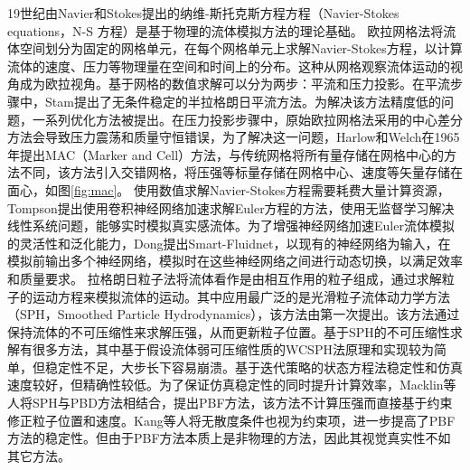\indent 19世纪由Navier和Stokes提出的纳维-斯托克斯方程方程（Navier-Stokes equations，N-S 方程）是基于物理的流体模拟方法的理论基础\cite{constantin1988navier}。
欧拉网格法\cite{chen2020extended}将流体空间划分为固定的网格单元，在每个网格单元上求解Navier-Stokes方程，以计算流体的速度、压力等物理量在空间和时间上的分布。这种从网格观察流体运动的视角成为欧拉视角。基于网格的数值求解可以分为两步：平流和压力投影\cite{chorin1968numerical}。在平流步骤中，Stam\cite{stam2023stable}提出了无条件稳定的半拉格朗日平流方法。为解决该方法精度低的问题，一系列优化方法被提出\cite{selle2008unconditionally, qu2019efficient, molemaker2008low}。在压力投影步骤中，原始欧拉网格法采用的中心差分方法会导致压力震荡和质量守恒错误，为了解决这一问题，Harlow和Welch\cite{harlow1962particle}在1965年提出MAC（Marker and Cell）方法，与传统网格将所有量存储在网格中心的方法不同，该方法引入交错网格，将压强等标量存储在网格中心、速度等矢量存储在面心，如图\ref{fig:mac}。
\newline
\indent 使用数值求解Navier-Stokes方程需要耗费大量计算资源，Tompson\cite{tompson2017accelerating}提出使用卷积神经网络加速求解Euler方程的方法，使用无监督学习解决线性系统问题，能够实时模拟真实感流体。为了增强神经网络加速Euler流体模拟的灵活性和泛化能力，Dong\cite{dong2019adaptive}提出Smart-Fluidnet，以现有的神经网络为输入，在模拟前输出多个神经网络，模拟时在这些神经网络之间进行动态切换，以满足效率和质量要求。
\newline
\indent 拉格朗日粒子法将流体看作是由相互作用的粒子组成，通过求解粒子的运动方程来模拟流体的运动。其中应用最广泛的是光滑粒子流体动力学方法（SPH，Smoothed Particle Hydrodynamics），该方法由\cite{monaghan2005smoothed}第一次提出。该方法通过保持流体的不可压缩性来求解压强，从而更新粒子位置。基于SPH的不可压缩性求解有很多方法，其中基于假设流体弱可压缩性质的WCSPH法\cite{becker2007weakly}原理和实现较为简单，但稳定性不足，大步长下容易崩溃。基于迭代策略的状态方程法\cite{bender2015divergence}稳定性和仿真速度较好，但精确性较低。为了保证仿真稳定性的同时提升计算效率，Macklin等人将SPH与PBD方法相结合，提出PBF\cite{macklin2013position}方法，该方法不计算压强而直接基于约束修正粒子位置和速度。Kang等人\cite{kang2014incompressible}将无散度条件也视为约束项，进一步提高了PBF方法的稳定性。但由于PBF方法本质上是非物理的方法，因此其视觉真实性不如其它方法。



